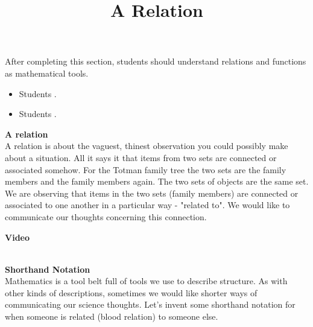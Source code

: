 \documentclass{ximera}
\title{A Relation}
\begin{document}
\begin{abstract}
\end{abstract}

\maketitle

\begin{sectionOutcomes}

After completing this section, students should understand relations and functions as mathematical tools. 

\begin{itemize}
\item Students .
\item Students .
\end{itemize}

\end{sectionOutcomes}




\textbf{A relation} \\
A relation is about the vaguest, thinest observation you could possibly make about a situation.  All it says it that items from two sets are connected or associated somehow.  For the Totman family tree the two sets are the family members and the family members again. The two sets of objects are the same set.  We are observing that items in the two sets (family members) are connected or associated to one another in a particular way - "related to". 
We would like to communicate our thoughts concerning this connection. 

\begin{explanation} \textbf{Video}
\begin{center}
\end{center}
\end{explanation}
\quad \\







\textbf{Shorthand Notation} \\
Mathematics is a tool belt full of tools we use to describe structure. As with other kinds of descriptions, sometimes we would like shorter ways of communicating our science thoughts.  Let's invent some shorthand notation for when someone is related (blood relation) to someone else.
\end{document}
